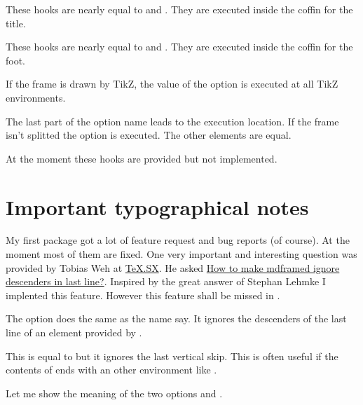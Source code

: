 \documentclass[openany,12pt,tocdepth=3]{ltx-md}
\begin{document}
These hooks are nearly equal to  and .
They are executed inside the coffin for the title.

These hooks are nearly equal to  and .
They are executed inside the coffin for the foot.


If the frame is drawn by TikZ, the value of the 
option  is executed at all
TikZ environments. 

The last part of the option name leads to the execution location.
If the frame isn't splitted the option  is executed. The
other elements are equal.

At the moment these hooks are provided but not implemented.



\section{Important typographical notes}
My first package  got a lot of feature request and
bug reports (of course). At the moment most of them are fixed. 
One very important and interesting question was provided by
Tobias Weh at \href{http://tex.stackexchange.com/}{TeX.SX}. He asked
\href{http://tex.stackexchange.com/questions/47584/how-to-make-mdframed-ignore-descenders-in-last-line}%
{How to make mdframed ignore descenders in last line?}. Inspired by
the great answer of Stephan Lehmke I implented this feature. 
However this feature shall be missed in .

The option  does the same as
the name say. It ignores the descenders of the last
line of an element provided by .

This is equal to  but it ignores the
last vertical skip. This is often useful if the contents
of  ends with an other environment
like . 



Let me show the meaning of the two options 
and .
\end{document}
